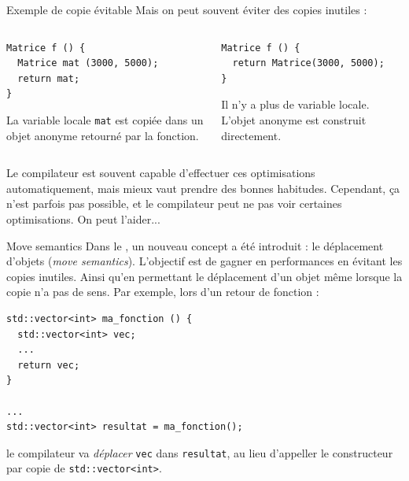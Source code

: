\documentclass[c]{beamer}
\newcommand{\inline}[1]{\texttt{#1}}
\begin{document}
\begin{frame}[fragile]{Exemple de copie évitable}
Mais on peut souvent éviter des copies inutiles :

\begin{columns}
\begin{column}{0.5\columnwidth}
\begin{verbatim}
Matrice f () {
  Matrice mat (3000, 5000);
  return mat;
}
\end{verbatim}

\begin{cbox}[][lwuc][\centering\footnotesize]
La variable locale \texttt{mat} est copiée dans un objet anonyme retourné par la fonction.
\end{cbox}

\end{column}
\begin{column}{0.5\columnwidth}
\begin{verbatim}
Matrice f () {
  return Matrice(3000, 5000);
}
\end{verbatim}

\vspace{0.7em}

\begin{cbox}[][lwuc][\centering\footnotesize]
Il n'y a plus de variable locale. L'objet anonyme est construit directement.
\end{cbox}
\end{column}
\end{columns}

\vspace{1.5em}
\pause
Le compilateur est souvent capable d'effectuer ces optimisations automatiquement, mais mieux vaut prendre des bonnes habitudes. Cependant, ça n'est parfois pas possible, et le compilateur peut ne pas voir certaines optimisations. On peut l'aider...

\end{frame}


\begin{frame}[fragile]{Move semantics}
Dans le , un nouveau concept a été introduit : le déplacement d'objets (\textit{move semantics}). L'objectif est de gagner en performances en évitant les copies inutiles. Ainsi qu'en permettant le déplacement d'un objet même lorsque la copie n'a pas de sens. Par exemple, lors d'un retour de fonction :
\begin{verbatim}
std::vector<int> ma_fonction () {
  std::vector<int> vec;
  ...
  return vec;
}

...
std::vector<int> resultat = ma_fonction();
\end{verbatim}
le compilateur va \emph{déplacer} \texttt{vec} dans \texttt{resultat}, au lieu d'appeller le constructeur par copie de \inline{std::vector<int>}.
\end{frame}
\end{document}
